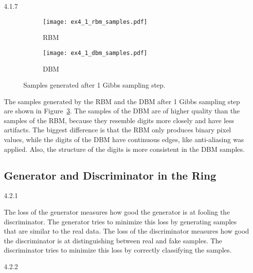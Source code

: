 \begin{task}{4.1.7}
\end{task}

\begin{figure}[ht]
  \centering
  \begin{subfigure}{0.49\textwidth}
    \texttt{[image: ex4\_1\_rbm\_samples.pdf]}
    \caption{RBM}
    \label{fig:ex4_1_rbm_samples}
  \end{subfigure}
  \begin{subfigure}{0.49\textwidth}
    \texttt{[image: ex4\_1\_dbm\_samples.pdf]}
    \caption{DBM}
    \label{fig:ex4_1_dbm_samples}
  \end{subfigure}
  \caption{Samples generated after 1 Gibbs sampling step.}
  \label{fig:ex4_1_samples}
\end{figure}

The samples generated by the RBM and the DBM after 1 Gibbs sampling step are shown in
Figure~\ref{fig:ex4_1_samples}. The samples of the DBM are of higher quality than the samples of the
RBM, because they resemble digits more closely and have less artifacts. The biggest difference is
that the RBM only produces binary pixel values, while the digits of the DBM have continuous edges,
like anti-aliasing was applied. Also, the structure of the digits is more consistent in the DBM
samples.


\subsection{Generator and Discriminator in the Ring}
\label{ex:4.2}

\begin{task}{4.2.1}
\end{task}

The loss of the generator measures how good the generator is at fooling the discriminator. The
generator tries to minimize this loss by generating samples that are similar to the real data. The
loss of the discriminator measures how good the discriminator is at distinguishing between real and
fake samples. The discriminator tries to minimize this loss by correctly classifying the samples.


\begin{task}{4.2.2}
\end{task}

